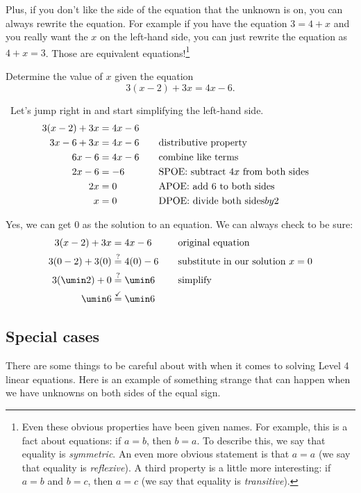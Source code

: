 Plus, if you don't like the side of the equation that the unknown is on, you can always rewrite the equation. For example if you have the equation $3=4+x$ and you really want the $x$ on the left-hand side, you can just rewrite the equation as $4+x=3$. Those are equivalent equations!\footnote{Even these obvious properties have been given names. For example, this is a fact about equations: if $a=b$, then $b=a$. To describe this, we say that equality is \textit{symmetric}. An even more obvious statement is that $a=a$ (we say that equality is \textit{reflexive}). A third property is a little more interesting: if $a=b$ and $b=c$, then $a=c$ (we say that equality is \textit{transitive}). }

\begin{boxex}
Determine the value of $x$ given the equation \[3(x-2)+3x=4x-6.\]

\exsoln\ Let's jump right in and start simplifying the left-hand side.
\[\begin{aligned}
3(x-2)+3x &= 4x-6\\
3x-6+3x &= 4x-6
&&\text{\quad distributive property}\\
6x-6 &= 4x-6
&&\text{\quad combine like terms}\\
2x-6 &= -6
&&\text{\quad SPOE: subtract $4x$ from both sides}\\
2x &= 0
&&\text{\quad APOE: add 6 to both sides}\\
x &= 0
&&\text{\quad DPOE: divide both sides} by 2\\
\end{aligned}\]

Yes, we can get 0 as the solution to an equation. We can always check to be sure:
\[\begin{aligned}
3(x-2)+3x &= 4x-6
&& \text{\quad original equation}\\
3(0-2)+3(0) &\overset{?}{=} 4(0)-6
&& \text{\quad substitute in our solution $x = 0$}\\
3(\umin2)+0 &\overset{?}{=} \umin6
&& \text{\quad simplify}\\
\umin6 &\overset{\checkmark}{=} \umin6\\
\end{aligned}\]
\end{boxex}

\subsection{Special cases}

There are some things to be careful about with when it comes to solving Level 4 linear equations. Here is an example of something strange that can happen when we have unknowns on both sides of the equal sign.

